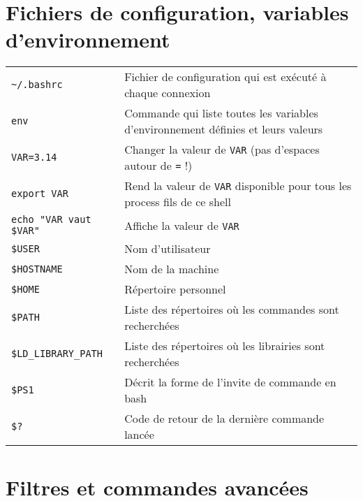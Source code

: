 \documentclass [a4paper]{article}
\begin{document}
\section*{Fichiers de configuration, variables d'environnement}

\noindent
\begin{tabular}{ll}
\hline
{\verb+~/.bashrc+}            & Fichier de configuration qui est exécuté à chaque connexion\\
{\verb+env+}                  & Commande qui liste toutes les variables d'environnement définies et leurs valeurs\\
{\verb+VAR=3.14+}             & Changer la valeur de \verb+VAR+ (pas d'espaces autour de \verb+=+ !)\\
{\verb+export VAR+}           & Rend la valeur de \verb+VAR+ disponible pour tous les process fils de ce shell\\
{\verb+echo "VAR vaut $VAR"+} & Affiche la valeur de \verb+VAR+\\
{\verb+$USER+}                & Nom d'utilisateur\\
{\verb+$HOSTNAME+}            & Nom de la machine\\
{\verb+$HOME+}                & Répertoire personnel\\
{\verb+$PATH+}                & Liste des répertoires où les commandes sont recherchées\\
{\verb+$LD_LIBRARY_PATH+}     & Liste des répertoires où les librairies sont recherchées\\
{\verb+$PS1+}                 & Décrit la forme de l'invite de commande en bash\\
{\verb+$?+}                   & Code de retour de la dernière commande lancée \\
\hline
\end{tabular}

\section*{Filtres et commandes avancées}
\end{document}
